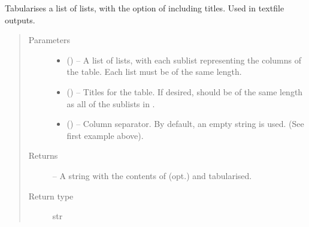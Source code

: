 \documentclass[letterpaper,10pt,english]{sphinxmanual}
\begin{document}
\begin{fulllineitems}
\label{\detokenize{references/write:nmrespy.write._txt_tabular}}
\sphinxAtStartPar
Tabularises a list of lists, with the option of including titles.
Used in textfile outputs.
\begin{quote}\begin{description}
\item[{Parameters}] \leavevmode\begin{itemize}
\item {} 
\sphinxAtStartPar
{} () – A list of lists, with each sublist representing the columns of the
table. Each list must be of the same length.

\item {} 
\sphinxAtStartPar
{} (\sphinxstyleliteralemphasis{\sphinxupquote{, }}) – Titles for the table. If desired,  should be of the same
length as all of the sublists in .

\item {} 
\sphinxAtStartPar
{} (\sphinxstyleliteralemphasis{\sphinxupquote{, }}) – Column separator. By default, an empty string is used. (See first
example above).

\end{itemize}

\item[{Returns}] \leavevmode
\sphinxAtStartPar
{} – A string with the contents of  (opt.) and 
tabularised.

\item[{Return type}] \leavevmode
\sphinxAtStartPar
str

\end{description}\end{quote}

\end{fulllineitems}
\end{document}
